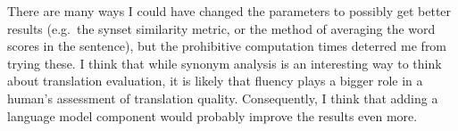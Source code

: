 \documentclass[11pt, oneside]{article}      %
\begin{document}
There are many ways I could have changed the parameters to possibly get better results (e.g.\ the synset similarity metric, or the method of averaging the word scores in the sentence), but the prohibitive computation times deterred me from trying these.  I think that while synonym analysis is an interesting way to think about translation evaluation, it is likely that fluency plays a bigger role in a human's assessment of translation quality.  Consequently, I think that adding a language model component would probably improve the results even more.
\end{document}
